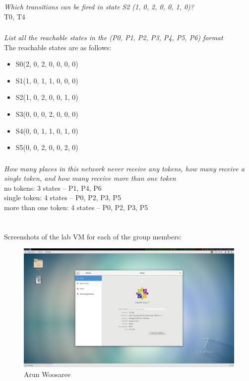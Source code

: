 \documentclass[letterpaper]{article}
\begin{document}
\subsubsection{}
\textit{Which transitions can be fired in state S2 (1, 0, 2, 0, 0, 1, 0)?}\\

T0, T4

\subsubsection{}
\textit{List all the reachable states in the (P0, P1, P2, P3, P4, P5, P6) format}\\

The reachable states are as follows:
\begin{itemize}
 \item S0(2, 0, 2, 0, 0, 0, 0)
 \item S1(1, 0, 1, 1, 0, 0, 0)
 \item S2(1, 0, 2, 0, 0, 1, 0)
 \item S3(0, 0, 0, 2, 0, 0, 0)
 \item S4(0, 0, 1, 1, 0, 1, 0)
 \item S5(0, 0, 2, 0, 0, 2, 0)
\end{itemize}

\subsubsection{}
\textit{How many places in this network never receive any tokens, how many receive a single token, and how many receive more than one token}
\noindent\\
no tokens: 3 states -- P1, P4, P6\\
single token: 4 states -- P0, P2, P3, P5\\
more than one token: 4 states -- P0, P2, P3, P5\\


\section{}

Screenshots of the lab VM for each of the group members:

\begin{figure}[H]
 \centering
 \includegraphics[width=\textwidth]{arun.png}
 \caption{Arun Woosaree}
\end{figure}
\end{document}
